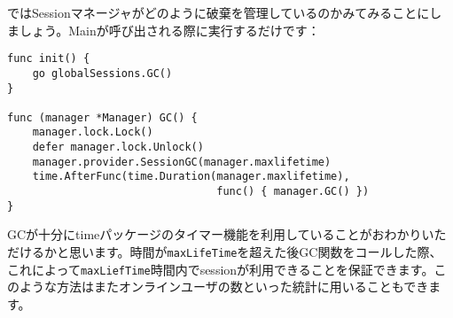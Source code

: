 ではSessionマネージャがどのように破棄を管理しているのかみてみることにしましょう。Mainが呼び出される際に実行するだけです：

\begin{lstlisting}[numbers=none]
func init() {
    go globalSessions.GC()
}

func (manager *Manager) GC() {
    manager.lock.Lock()
    defer manager.lock.Unlock()
    manager.provider.SessionGC(manager.maxlifetime)
    time.AfterFunc(time.Duration(manager.maxlifetime),
                                 func() { manager.GC() })
}
\end{lstlisting}

GCが十分にtimeパッケージのタイマー機能を利用していることがおわかりいただけるかと思います。時間が\texttt{maxLifeTime}を超えた後GC関数をコールした際、これによって\texttt{maxLiefTime}時間内でsessionが利用できることを保証できます。このような方法はまたオンラインユーザの数といった統計に用いることもできます。
